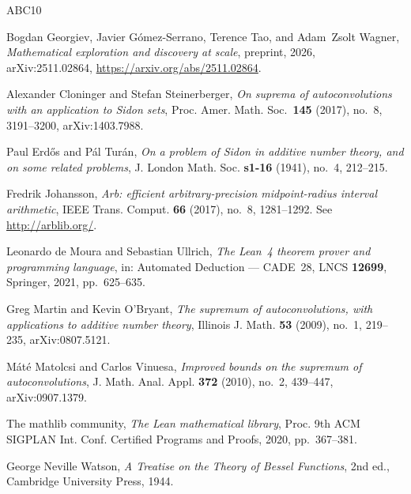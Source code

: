 \documentclass[11pt, letterpaper]{article}
\theoremstyle{plain}
\theoremstyle{definition}
\begin{document}
\begin{thebibliography}{ABC10}

Bogdan Georgiev, Javier G\'omez-Serrano, Terence Tao, and Adam~Zsolt
Wagner, \emph{Mathematical exploration and discovery at scale},
preprint, 2026, arXiv:2511.02864,
\url{https://arxiv.org/abs/2511.02864}.

Alexander Cloninger and Stefan Steinerberger, \emph{On suprema of
autoconvolutions with an application to Sidon sets}, Proc. Amer. Math.
Soc.\ \textbf{145} (2017), no.~8, 3191--3200, arXiv:1403.7988.

Paul Erd\H{o}s and P\'al Tur\'an, \emph{On a problem of Sidon in additive
number theory, and on some related problems}, J. London Math. Soc.
\textbf{s1-16} (1941), no.~4, 212--215.

Fredrik Johansson, \emph{Arb: efficient arbitrary-precision midpoint-radius
interval arithmetic}, IEEE Trans. Comput. \textbf{66} (2017), no.~8,
1281--1292.  See \url{http://arblib.org/}.

Leonardo de Moura and Sebastian Ullrich, \emph{The Lean~4 theorem prover
and programming language}, in: Automated Deduction --- CADE~28, LNCS
\textbf{12699}, Springer, 2021, pp.~625--635.

Greg Martin and Kevin O'Bryant, \emph{The supremum of autoconvolutions,
with applications to additive number theory}, Illinois J. Math.
\textbf{53} (2009), no.~1, 219--235, arXiv:0807.5121.

M\'at\'e Matolcsi and Carlos Vinuesa, \emph{Improved bounds on the supremum
of autoconvolutions}, J. Math. Anal. Appl. \textbf{372} (2010), no.~2,
439--447, arXiv:0907.1379.

The mathlib community, \emph{The Lean mathematical library}, Proc.
9th ACM SIGPLAN Int. Conf. Certified Programs and Proofs, 2020,
pp.~367--381.

George Neville Watson, \emph{A Treatise on the Theory of Bessel
Functions}, 2nd ed., Cambridge University Press, 1944.

\end{thebibliography}
\end{document}
